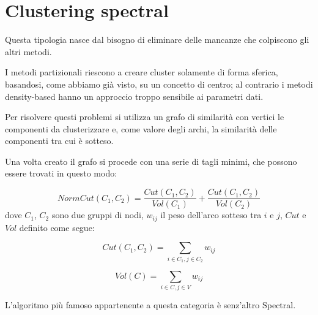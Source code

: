 \section{Clustering spectral}
	Questa tipologia nasce dal bisogno di eliminare delle mancanze che colpiscono gli altri metodi. 

	I metodi partizionali riescono a creare cluster solamente di forma sferica, basandosi, come abbiamo già visto, su un concetto di centro; al contrario i metodi density-based hanno un approccio troppo sensibile ai parametri dati.

	Per risolvere questi problemi si utilizza un grafo di similarità con vertici le componenti da clusterizzare e, come valore degli archi, la similarità delle componenti tra cui è sotteso.

	Una volta creato il grafo si procede con una serie di tagli minimi, che possono essere trovati in questo modo:

	\begin{equation*}
		NormCut(C_1, C_2) =  \frac{Cut(C_1, C_2)}{Vol(C_1)} + \frac{Cut(C_1, C_2)}{Vol(C_2)}
	\end{equation*}
	dove $C_1$, $C_2$ sono due gruppi di nodi,  $w_{ij}$ il peso dell'arco sotteso tra $i$ e $j$, $Cut$ e $Vol$ definito come segue:

	\begin{equation*}
		Cut(C_1, C_2) = \sum_{i \in C_1, j \in C_2} {w_{ij}}
	\end{equation*}

	\begin{equation*}
		Vol(C) = \sum_{i \in C, j \in V} {w_{ij}}
	\end{equation*}

	L'algoritmo più famoso appartenente a questa categoria è senz'altro Spectral.